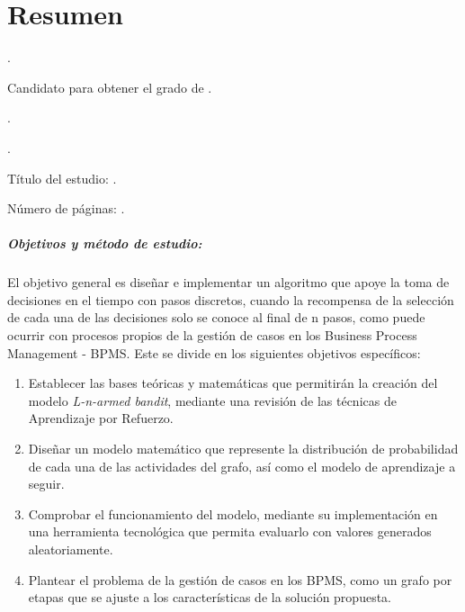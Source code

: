 
\chapter{Resumen}

{\renewcommand{\baselinestretch}{1.1}\selectfont
{\setlength{\leftskip}{10mm}
\setlength{\parindent}{-10mm}

\autor.

Candidato para obtener el grado de \grado\orientacion.

\uanl.

\fime.

Título del estudio: \textsc{\titulo}.

\noindent Número de páginas: \pageref*{lastpage}.}

\paragraph{Objetivos y método de estudio:}

El objetivo general es diseñar e implementar un algoritmo que apoye la toma de decisiones en el tiempo con pasos discretos, cuando la recompensa de la selección de cada una de las decisiones solo se conoce al final de n pasos, como puede ocurrir con procesos propios de la gestión de casos en los Business Process Management - BPMS. Este se divide en los siguientes objetivos específicos:

\begin{enumerate}

\item Establecer las bases teóricas y matemáticas que permitirán la creación del modelo \textit{L-n-armed bandit}, mediante una revisión de las técnicas de Aprendizaje por Refuerzo.

\item Diseñar un modelo matemático que represente la distribución de probabilidad de cada una de las actividades del grafo, así como el modelo de aprendizaje a seguir.

\item Comprobar el funcionamiento del modelo, mediante su implementación en una herramienta tecnológica que permita evaluarlo con valores generados aleatoriamente.  

\item Plantear el problema de la gestión de casos en los BPMS, como un grafo por etapas que se ajuste a los características de la solución propuesta.
\end{enumerate}

}
